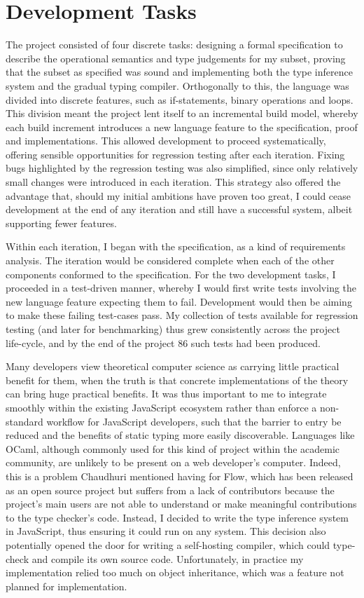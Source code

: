 \documentclass[12pt,a4paper,twoside,openright]{report}
\begin{document}
\section{Development Tasks}

The project consisted of four discrete tasks: designing a formal specification
to describe the operational semantics and type judgements for my subset,
proving that the subset as specified was sound and implementing both the type
inference system and the gradual typing compiler. Orthogonally to this, the
language was divided into discrete features, such as if-statements, binary
operations and loops. This division meant the project lent itself to an
incremental build model, whereby each build increment introduces a new language
feature to the specification, proof and implementations. This allowed
development to proceed systematically, offering sensible opportunities for
regression testing after each iteration. Fixing bugs highlighted by the
regression testing was also simplified, since only relatively small changes
were introduced in each iteration. This strategy also offered the advantage
that, should my initial ambitions have proven too great, I could cease
development at the end of any iteration and still have a successful system,
albeit supporting fewer features.

Within each iteration, I began with the specification, as a kind of
requirements analysis. The iteration would be considered complete when each of
the other components conformed to the specification. For the two development
tasks, I proceeded in a test-driven manner, whereby I would first write tests
involving the new language feature expecting them to fail. Development would
then be aiming to make these failing test-cases pass. My collection of tests
available for regression testing (and later for benchmarking) thus grew
consistently across the project life-cycle, and by the end of the project 86
such tests had been produced.

Many developers view theoretical computer science as carrying little practical
benefit for them, when the truth is that concrete implementations of the theory
can bring huge practical benefits. It was thus important to me to integrate
smoothly within the existing JavaScript ecosystem rather than enforce a
non-standard workflow for JavaScript developers, such that the barrier to entry
be reduced and the benefits of static typing more easily discoverable.
Languages like OCaml, although commonly used for this kind of project within
the academic community, are unlikely to be present on a web developer's
computer. Indeed, this is a problem Chaudhuri mentioned having for Flow, which
has been released as an open source project but suffers from a lack of
contributors because the project's main users are not able to understand or
make meaningful contributions to the type checker's code. Instead, I decided to
write the type inference system in JavaScript, thus ensuring it could run on
any system. This decision also potentially opened the door for writing a
self-hosting compiler, which could type-check and compile its own source code.
Unfortunately, in practice my implementation relied too much on object
inheritance, which was a feature not planned for implementation.
\end{document}
